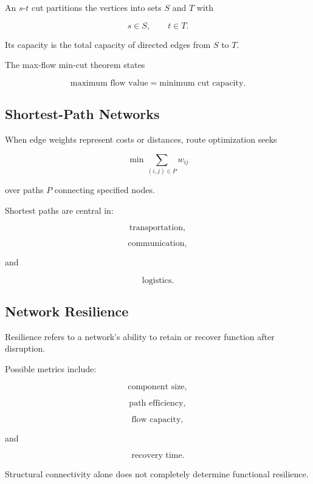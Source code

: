 An \(s\)-\(t\) cut partitions the vertices into sets \(S\) and \(T\) with

\[
s\in S,
\qquad
t\in T.
\]

Its capacity is the total capacity of directed edges from \(S\) to \(T\).

The max-flow min-cut theorem states

\[
\boxed{
\text{maximum flow value}
=
\text{minimum cut capacity}.
}
\]

\subsection{Shortest-Path Networks}
\label{subsec:network-shortest-paths}

When edge weights represent costs or distances, route optimization seeks

\[
\boxed{
\min
\sum_{(i,j)\in P}
w_{ij}
}
\]

over paths \(P\) connecting specified nodes.

Shortest paths are central in:

\[
\boxed{
\text{transportation},
}
\]

\[
\boxed{
\text{communication},
}
\]

and

\[
\boxed{
\text{logistics}.
}
\]

\subsection{Network Resilience}
\label{subsec:network-resilience}

Resilience refers to a network's ability to retain or recover function after
disruption.

Possible metrics include:

\[
\boxed{
\text{component size},
}
\]

\[
\boxed{
\text{path efficiency},
}
\]

\[
\boxed{
\text{flow capacity},
}
\]

and

\[
\boxed{
\text{recovery time}.
}
\]

Structural connectivity alone does not completely determine functional
resilience.

